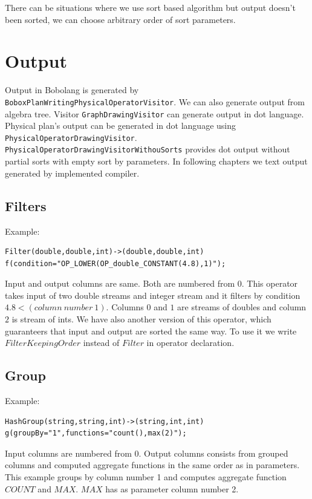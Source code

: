 There can be situations where we use sort based algorithm but output doesn't been sorted, we can choose arbitrary order of sort parameters. 


\section{Output}

 Output in Bobolang is generated by \texttt{BoboxPlanWritingPhysicalOperatorVisitor}. We can also generate output from algebra tree. Visitor \texttt{GraphDrawingVisitor} can generate output in dot language. Physical plan's output can be generated in dot language using \texttt{Physical\-Operator\-Drawing\-Visitor}. \texttt{Physical\-Operator\-Drawing\-Visitor\-WithouSorts} provides dot output without partial sorts with empty sort by parameters. In following chapters we text output generated by implemented compiler.

\subsection{Filters}
Example: 
\begin{lstlisting}
Filter(double,double,int)->(double,double,int)
f(condition="OP_LOWER(OP_double_CONSTANT(4.8),1)"); 
\end{lstlisting}

Input and output columns are same. Both are numbered from 0.
This operator takes input of two double streams and integer stream and it filters by condition $4.8<(column~number~1)$. Columns $0$ and $1$ are streams of doubles and column $2$ is stream of ints. We have also another version of this operator, which guaranteers that input and output are sorted the same way. To use it we write $FilterKeepingOrder$ instead of $Filter$ in operator declaration. 

\subsection{Group}
Example: 
\begin{lstlisting}
HashGroup(string,string,int)->(string,int,int)
g(groupBy="1",functions="count(),max(2)");
\end{lstlisting}
Input columns are numbered from 0. Output columns consists from grouped columns and computed aggregate functions in the same order as in parameters. 
This example groups by column number 1 and computes aggregate function $COUNT$ and $MAX$. $MAX$ has as parameter column number 2. 

